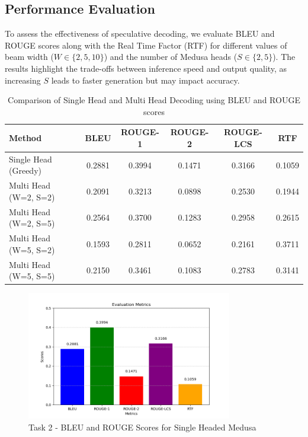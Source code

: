 \documentclass[12pt]{article}
\begin{document}
\subsection{Performance Evaluation}
To assess the effectiveness of speculative decoding, we evaluate BLEU and ROUGE scores along with the Real Time Factor (RTF) for different values of beam width ($W \in \{2, 5, 10\}$) and the number of Medusa heads ($S \in \{2, 5\}$). The results highlight the trade-offs between inference speed and output quality, as increasing $S$ leads to faster generation but may impact accuracy.

\begin{table}[htbp]
    \centering
    \begin{tabular}{|lccccc|}
        \hline
        \textbf{Method} & \textbf{BLEU} & \textbf{ROUGE-1} & \textbf{ROUGE-2} & \textbf{ROUGE-LCS} & \textbf{RTF} \\
        \hline
        Single Head (Greedy) & 0.2881 & 0.3994 & 0.1471 & 0.3166 & 0.1059 \\
        \hline
        Multi Head (W=2, S=2) & 0.2091 & 0.3213 & 0.0898 & 0.2530 & 0.1944 \\
        Multi Head (W=2, S=5) & 0.2564 & 0.3700 & 0.1283 & 0.2958 & 0.2615 \\
        Multi Head (W=5, S=2) & 0.1593 & 0.2811 & 0.0652 & 0.2161 & 0.3711 \\
        Multi Head (W=5, S=5) & 0.2150 & 0.3461 & 0.1083 & 0.2783 & 0.3141 \\
        \hline
    \end{tabular}
    \caption{Comparison of Single Head and Multi Head Decoding using BLEU and ROUGE scores}
    \label{tab:medusa_comparison}
\end{table}

\begin{figure}[htbp]
    \centering
    \includegraphics[width=0.8\textwidth]{task2_single.png}
    \caption{Task 2 - BLEU and ROUGE Scores for Single Headed Medusa}
    \label{fig:task2_single}
\end{figure}
\end{document}
